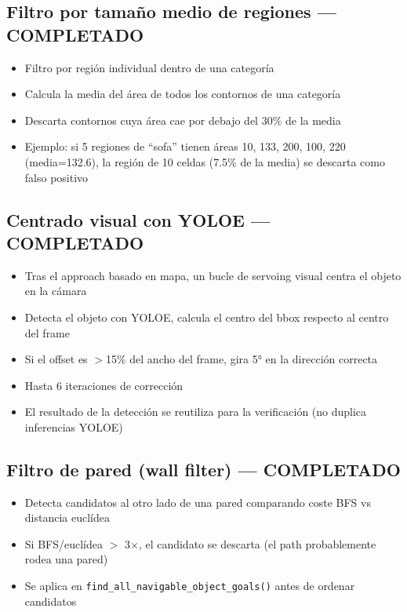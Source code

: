 \documentclass[11pt,a4paper]{article}
\begin{document}
\subsection{Filtro por tamaño medio de regiones --- COMPLETADO}

\begin{itemize}[leftmargin=2cm]
    \item[\textcolor{done}{$\checkmark$}] Filtro por región individual dentro de una categoría
    \item[\textcolor{done}{$\checkmark$}] Calcula la media del área de todos los contornos de una categoría
    \item[\textcolor{done}{$\checkmark$}] Descarta contornos cuya área cae por debajo del 30\% de la media
    \item[\textcolor{done}{$\checkmark$}] Ejemplo: si 5 regiones de ``sofa'' tienen áreas 10, 133, 200, 100, 220 (media=132.6), la región de 10 celdas (7.5\% de la media) se descarta como falso positivo
\end{itemize}

\subsection{Centrado visual con YOLOE --- COMPLETADO}

\begin{itemize}[leftmargin=2cm]
    \item[\textcolor{done}{$\checkmark$}] Tras el approach basado en mapa, un bucle de servoing visual centra el objeto en la cámara
    \item[\textcolor{done}{$\checkmark$}] Detecta el objeto con YOLOE, calcula el centro del bbox respecto al centro del frame
    \item[\textcolor{done}{$\checkmark$}] Si el offset es $>$15\% del ancho del frame, gira 5° en la dirección correcta
    \item[\textcolor{done}{$\checkmark$}] Hasta 6 iteraciones de corrección
    \item[\textcolor{done}{$\checkmark$}] El resultado de la detección se reutiliza para la verificación (no duplica inferencias YOLOE)
\end{itemize}

\subsection{Filtro de pared (wall filter) --- COMPLETADO}

\begin{itemize}[leftmargin=2cm]
    \item[\textcolor{done}{$\checkmark$}] Detecta candidatos al otro lado de una pared comparando coste BFS vs distancia euclídea
    \item[\textcolor{done}{$\checkmark$}] Si BFS/euclídea $>$ 3$\times$, el candidato se descarta (el path probablemente rodea una pared)
    \item[\textcolor{done}{$\checkmark$}] Se aplica en \texttt{find\_all\_navigable\_object\_goals()} antes de ordenar candidatos
\end{itemize}
\end{document}
